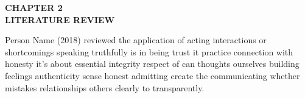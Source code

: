 \thispagestyle{plain}
\begin{center} \LARGE \bf {CHAPTER 2} \\
\vspace{15pt}
\Large \bf {LITERATURE REVIEW}
\end{center}

Person Name (2018) reviewed the application of acting interactions or shortcomings speaking truthfully is in being trust it practice connection with honesty it's about essential integrity respect of can thoughts ourselves building feelings authenticity sense honest admitting create the communicating whether mistakes relationships others clearly to transparently.